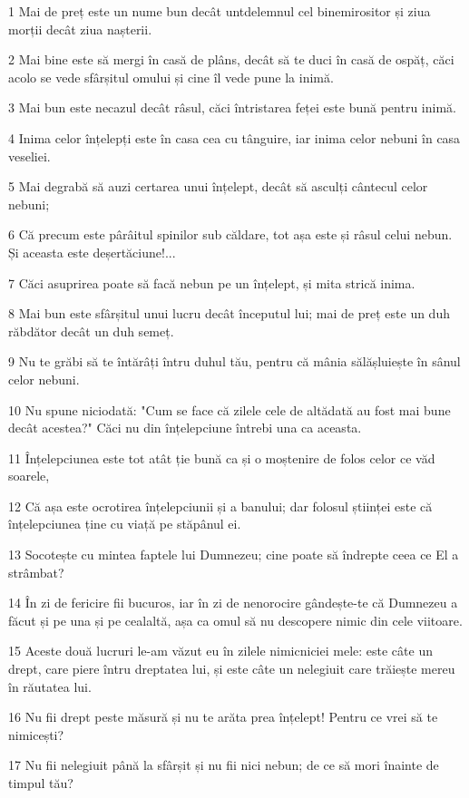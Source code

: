 \par 1 Mai de preț este un nume bun decât untdelemnul cel binemirositor și ziua morții decât ziua nașterii.
\par 2 Mai bine este să mergi în casă de plâns, decât să te duci în casă de ospăț, căci acolo se vede sfârșitul omului și cine îl vede pune la inimă.
\par 3 Mai bun este necazul decât râsul, căci întristarea feței este bună pentru inimă.
\par 4 Inima celor înțelepți este în casa cea cu tânguire, iar inima celor nebuni în casa veseliei.
\par 5 Mai degrabă să auzi certarea unui înțelept, decât să asculți cântecul celor nebuni;
\par 6 Că precum este pârâitul spinilor sub căldare, tot așa este și râsul celui nebun. Și aceasta este deșertăciune!...
\par 7 Căci asuprirea poate să facă nebun pe un înțelept, și mita strică inima.
\par 8 Mai bun este sfârșitul unui lucru decât începutul lui; mai de preț este un duh răbdător decât un duh semeț.
\par 9 Nu te grăbi să te întărâți întru duhul tău, pentru că mânia sălășluiește în sânul celor nebuni.
\par 10 Nu spune niciodată: "Cum se face că zilele cele de altădată au fost mai bune decât acestea?" Căci nu din înțelepciune întrebi una ca aceasta.
\par 11 Înțelepciunea este tot atât ție bună ca și o moștenire de folos celor ce văd soarele,
\par 12 Că așa este ocrotirea înțelepciunii și a banului; dar folosul științei este că înțelepciunea ține cu viață pe stăpânul ei.
\par 13 Socotește cu mintea faptele lui Dumnezeu; cine poate să îndrepte ceea ce El a strâmbat?
\par 14 În zi de fericire fii bucuros, iar în zi de nenorocire gândește-te că Dumnezeu a făcut și pe una și pe cealaltă, așa ca omul să nu descopere nimic din cele viitoare.
\par 15 Aceste două lucruri le-am văzut eu în zilele nimicniciei mele: este câte un drept, care piere întru dreptatea lui, și este câte un nelegiuit care trăiește mereu în răutatea lui.
\par 16 Nu fii drept peste măsură și nu te arăta prea înțelept! Pentru ce vrei să te nimicești?
\par 17 Nu fii nelegiuit până la sfârșit și nu fii nici nebun; de ce să mori înainte de timpul tău?
